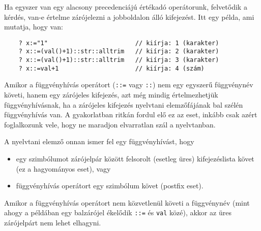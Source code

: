 Ha egyszer van egy alacsony precedenciájú értékadó operátorunk,
felvetődik a kérdés,  van-e értelme zárójelezni a jobboldalon álló kifejezést.
Itt egy példa, ami mutatja, hogy van:

\begin{verbatim}
    ? x:="1"                        // kiírja: 1 (karakter)
    ? x::=(val()+1)::str::alltrim   // kiírja: 2 (karakter)
    ? x::=(val()+1)::str::alltrim   // kiírja: 3 (karakter)
    ? x::=val+1                     // kiírja: 4 (szám)
\end{verbatim}

Amikor a függvényhívás operátort (\verb!::=! vagy \verb!::!) 
nem egy egyszerű függvénynév követi, hanem egy zárójeles kifejezés,
azt még mindig értelmezhetjük függvényhívásnak, ha a zárójeles kifejezés
nyelvtani elemzőfájának bal szélén függvényhívás van. A gyakorlatban
ritkán fordul elő ez az eset, inkább csak azért foglalkozunk vele, 
hogy ne maradjon elvarratlan szál a nyelvtanban.

A nyelvtani elemző onnan ismer fel egy függvényhívást, hogy
\begin{itemize}
 \item egy szimbólumot zárójelpár között felsorolt (esetleg üres) 
       kifejezéslista követ (ez a hagyományos eset), vagy
 \item
      függvényhívás operátort egy szimbólum követ (postfix eset).
\end{itemize}
Amikor a függvényhívás operátort nem közvetlenül követi a függvénynév
(mint ahogy a példában egy balzárójel ékelődik \verb!::=! és \verb!val! közé),
akkor az üres zárójelpárt nem lehet elhagyni.

